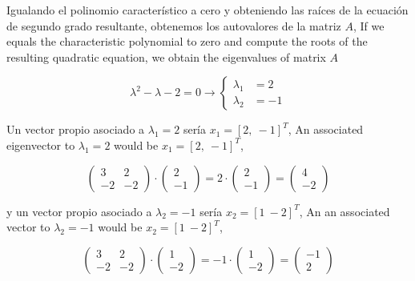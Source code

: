 \begin{paracol}{2}
Igualando el polinomio característico a cero y obteniendo las raíces de la ecuación de segundo grado resultante, obtenemos los autovalores de la matriz $A$,
\switchcolumn
If we equals the characteristic polynomial to zero and compute the roots of the resulting quadratic equation, we obtain the eigenvalues of matrix $A$
\end{paracol}
\begin{equation*}
\lambda^2-\lambda-2=0 \rightarrow \left\{ 
\begin{aligned}
\lambda_1&=2\\
\lambda_2&=-1
\end{aligned}
\right.
\end{equation*}
\begin{paracol}{2}
Un vector propio asociado a $\lambda_1=2$ sería $x_1=[2,\  -1]^T$,
\switchcolumn
An associated eigenvector to $\lambda_1=2$  would be $x_1=[2,\  -1]^T$,
\end{paracol}
\begin{equation*}
\begin{pmatrix}
3& 2\\
-2& -2
\end{pmatrix}\cdot \begin{pmatrix}
2\\
-1
\end{pmatrix}=2\cdot \begin{pmatrix}
2\\
-1
\end{pmatrix} =\begin{pmatrix}
4\\
-2
\end{pmatrix} 
\end{equation*}
\begin{paracol}{2}
y un vector propio asociado a $\lambda_2=-1$ sería $x_2=[1\ -2]^T$,
\switchcolumn
An an associated vector to $\lambda_2=-1$ would be $x_2=[1\ -2]^T$,
\end{paracol}
\begin{equation*}
\begin{pmatrix}
3& 2\\
-2& -2
\end{pmatrix}\cdot \begin{pmatrix}
1\\
-2
\end{pmatrix}=-1\cdot \begin{pmatrix}
1\\
-2
\end{pmatrix} =\begin{pmatrix}
-1\\
2
\end{pmatrix} 
\end{equation*}
